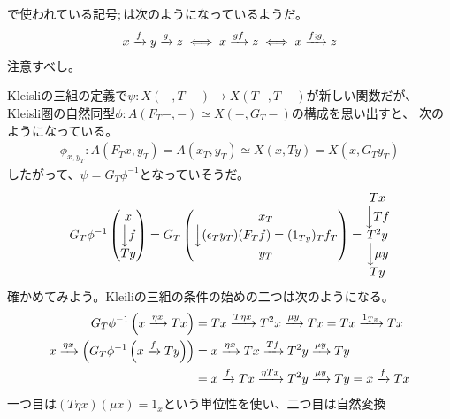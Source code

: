 {	\cite{Moggi199155}で使われている記号$;$は次のようになっているようだ。
	\begin{equation*}\begin{split}
		x\xrightarrow[{}]{f}y\xrightarrow[{}]{g}z \iff 	x\xrightarrow[{}]{gf}z \iff x\xrightarrow[{}]{f;g}z
	\end{split}\end{equation*}
	注意すべし。

	Kleisliの三組の定義で$\psi:X(-,T-)\to X(T-,T-)$が新しい関数だが、
	Kleisli圏の自然同型$\phi:A(F_T-,-)\simeq X(-,G_T-)$の構成を思い出すと、
	次のようになっている。
	\begin{equation*}\begin{split}
		\phi_{x,y_T}: A(F_Tx,y_T) = A(x_T,y_T) \simeq X(x,Ty) = X(x,G_Ty_T)
	\end{split}\end{equation*}
	したがって、$\psi=G_T\phi^{-1}$となっていそうだ。
	\begin{equation*}\begin{split}
		G_T\phi^{-1} \begin{pmatrix}
			x \\ \Big\downarrow{f} \\ Ty
		\end{pmatrix} = G_T \begin{pmatrix}
			x_T \\ \Big\downarrow{(\epsilon_Ty_T)(F_Tf)=(1_{Ty})_Tf_T} \\ y_T
		\end{pmatrix} = \begin{matrix}
			Tx \\ \Big\downarrow{Tf} \\ T^2 y \\ \Big\downarrow{\mu y}\\ Ty
		\end{matrix}
	\end{split}\end{equation*}
	確かめてみよう。Kleiliの三組の条件の始めの二つは次のようになる。
	\begin{equation*}\begin{split}
		G_T\phi^{-1}\mathinner{\left({x\ensuremath{\xrightarrow[{}]{\eta x}}Tx}\right)} &= Tx\xrightarrow[{}]{T\eta x}T^2x\xrightarrow[{}]{\mu y}Tx
		= Tx\xrightarrow[{}]{1_{Tx}}Tx \\
		x\xrightarrow[{}]{\eta x}\mathinner{\Bigl({G_T\phi^{-1}\mathinner{\left({x\ensuremath{\xrightarrow[{}]{f}}Ty}\right)}}\Bigr)}
		&= x\xrightarrow[{}]{\eta x}Tx\xrightarrow[{}]{Tf}T^2y\xrightarrow[{}]{\mu y}Ty \\
		&= x\xrightarrow[{}]{f}Tx\xrightarrow[{}]{\eta Tx}T^2y\xrightarrow[{}]{\mu y}Ty
		= x\xrightarrow[{}]{f}Tx \\
	\end{split}\end{equation*}
	一つ目は$(T\eta x)(\mu x)=1_x$という単位性を使い、二つ目は自然変換
}
